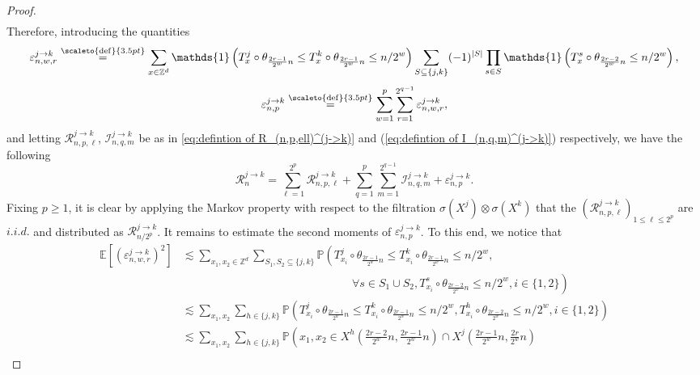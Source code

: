 \documentclass[12pt]{article}
\newcommand{\EE}{\mathbb E}
\newcommand{\PP}{\mathbb P}
\newcommand{\1}{\mathds{1}}
\newcommand{\ZZ}{\mathbb Z}
\newcommand{\eqdef}{\stackrel{\scaleto{\mathrm{def}}{3.5pt}}{=}}
\numberwithin{equation}{section}
\begin{document}
\begin{proof}
\begin{align*}
    \end{align*}
    Therefore, introducing the quantities
    \begin{equation*}
        \varepsilon_{n,w,r}^{j\rightarrow k}\eqdef\sum_{x\in\ZZ^d}\1\left(T_x^j\circ \theta_{\frac{2r-1}{2^w}n}\le T_x^k\circ\theta_{\frac{2r-1}{2^w}n}\le n/2^w\right)\sum_{S\subseteq\{j,k\}}(-1)^{|S|}\prod_{s\in S}\1\left(T_x^s\circ\theta_{\frac{2r-2}{2^w}n}\le n/2^w\right),
    \end{equation*}
    \begin{equation*}
        \varepsilon_{n,p}^{j\rightarrow k}\eqdef\sum_{w=1}^p\sum_{r=1}^{2^{q-1}}\varepsilon_{n,w,r}^{j\rightarrow k},
    \end{equation*}
    and letting $\mathcal R_{n,p,\ell}^{j\rightarrow k}$, $\mathcal I_{n,q,m}^{j\rightarrow k}$ be as in \eqref{eq:defintion of R_(n,p,ell)^(j->k)} and (\ref{eq:defintion of I_(n,q,m)^(j->k)}) respectively, we have the following
    \begin{equation*}
        \mathcal R_n^{j\rightarrow k}=\sum_{\ell=1}^{2^p}\mathcal R_{n,p,\ell}^{j\rightarrow k}+\sum_{q=1}^p\sum_{m=1}^{2^{q-1}}\mathcal I_{n,q,m}^{j\rightarrow k}+\varepsilon_{n,p}^{j\rightarrow k}.
    \end{equation*}
    Fixing $p\ge1$, it is clear by applying the Markov property with respect to the filtration $\sigma(X^j)\otimes\sigma(X^k)$ that the $(\mathcal R_{n,p,\ell}^{j\rightarrow k})_{1\le\ell\le 2^p}$ are $i.i.d.$ and distributed as $\mathcal R_{n/2^p}^{j\rightarrow k}$. It remains to estimate the second moments of $\varepsilon_{n,p}^{j\rightarrow k}$. To this end, we notice that
    \begin{align*}
        \EE\left[(\varepsilon_{n,w,r}^{j\rightarrow k})^2\right]&\lesssim\sum_{x_1,x_2\in\ZZ^d}\sum_{S_1,S_2\subseteq\{j,k\}}\PP\left(T_{x_i}^j\circ\theta_{\frac{2r-1}{2^w}n}\le T_{x_i}^{k}\circ\theta_{\frac{2r-1}{2^w}n}\le n/2^w,\right.\\
        &\hspace{15em}\left.\forall s\in S_1\cup S_2, T_{x_i}^s\circ\theta_{\frac{2r-2}{2^w}n}\le n/2^w, i\in\{1,2\}\right)\\
        &\lesssim\sum_{x_1,x_2}\sum_{h\in\{j,k\}}\PP\left(T_{x_i}^j\circ\theta_{\frac{2r-1}{2^w}n}\le T_{x_i}^{k}\circ\theta_{\frac{2r-1}{2^w}n}\le n/2^w,T_{x_i}^h\circ\theta_{\frac{2r-2}{2^w}n}\le n/2^w, i\in\{1,2\}\right)\\
        &\lesssim\sum_{x_1,x_2}\sum_{h\in\{j,k\}}\PP\left(x_1,x_2\in X^h\left(\frac{2r-2}{2^w}n,\frac{2r-1}{2^w}n\right)\cap X^{j}\left(\frac{2r-1}{2^w}n,\frac{2r}{2^w}n\right)\right.\\

\end{align*}
\end{proof}
\end{document}
